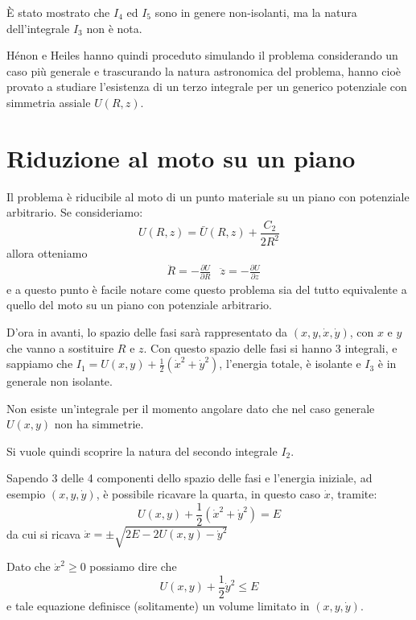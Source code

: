 \documentclass[a4paper, 12pt]{article}
\numberwithin{equation}{section}
\numberwithin{figure}{section}
\begin{document}
È stato mostrato che $I_4$ ed $I_5$ sono in genere non-isolanti, ma la natura dell'integrale
$I_3$ non è nota.

Hénon e Heiles hanno quindi proceduto simulando il problema considerando un caso più generale
e trascurando la natura astronomica del problema, hanno cioè provato a studiare l'esistenza
di un terzo integrale per un generico potenziale con simmetria assiale $U(R,z)$.

\clearpage

\section{Riduzione al moto su un piano}
Il problema è riducibile al moto di un punto materiale su un piano con potenziale arbitrario.
Se consideriamo:
\begin{equation}
	U(R,z) = \bar{U}(R,z) + \frac{C_2}{2R^2}
\end{equation}
allora otteniamo
\begin{align}
	&\ddot{R} = -\frac{\partial U}{\partial R}&
	\ddot{z} = -\frac{\partial U}{\partial z}
\end{align}
e a questo punto è facile notare come questo problema sia del tutto equivalente a quello del moto su un piano
con potenziale arbitrario.

D'ora in avanti, lo spazio delle fasi sarà rappresentato da $(x,y,\dot{x},\dot{y})$,
con $x$ e $y$ che vanno a sostituire $R$ e $z$. Con questo spazio delle fasi si hanno 3 integrali,
e sappiamo che $I_1 = U(x,y)+\frac{1}{2}(\dot{x}^2+\dot{y}^2)$, l'energia totale, è isolante e $I_3$ è
in generale non isolante.

Non esiste un'integrale per il momento angolare dato che nel caso generale $U(x,y)$ non ha
simmetrie.

Si vuole quindi scoprire la natura del secondo integrale $I_2$.

Sapendo 3 delle 4 componenti dello spazio delle fasi e l'energia iniziale, ad esempio $(x,y,\dot{y})$,
è possibile ricavare la quarta, in questo caso $\dot{x}$, tramite:
\begin{equation}
	U(x,y)+\frac{1}{2}(\dot{x}^2+\dot{y}^2) = E \label{eq:consenergiaxy}
\end{equation}
da cui si ricava $\dot{x} = \pm \sqrt{2E-2U(x,y)-\dot{y}^2}$

Dato che $\dot{x}^2 \ge 0$ possiamo dire che
\begin{equation}
	U(x,y)+\frac{1}{2}\dot{y}^2 \le E
\end{equation}
e tale equazione definisce (solitamente) un volume limitato in $(x,y,\dot{y})$.
\end{document}
